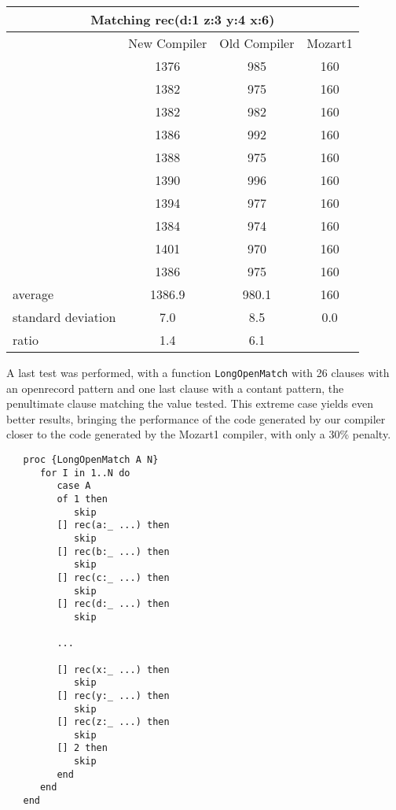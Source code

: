 \documentclass[a4paper]{memoir}
\begin{document}
\begin{appendices}
\begin{center}
\begin{tabular} {| l c c c|}
\hline
\multicolumn{4}{|c|}{\textbf{Matching rec(d:1 z:3 y:4 x:6)}} \\ \hline
  & New Compiler& Old Compiler & Mozart1 \\
  &         1376&  985& 160\\ 
  &         1382&  975& 160\\
  &         1382&  982& 160\\
  &         1386&  992& 160\\
  &         1388&  975& 160\\
  &         1390&  996& 160\\
  &         1394&  977& 160\\
  &         1384&  974& 160\\
  &         1401&  970& 160\\
  &         1386&  975& 160\\ \hline
average& 1386.9&  980.1& 160\\
standard deviation& 7.0& 8.5& 0.0\\
ratio& 1.4& 6.1 & \\
\hline
\end{tabular}
\end{center}


A last test was performed, with a function \lstinline!LongOpenMatch! with 26
clauses with an openrecord pattern and one last clause with a contant pattern, the penultimate clause matching the value tested.
This extreme case yields even better results, bringing the performance of the
code generated by our compiler closer to the code generated by the Mozart1
compiler, with only a 30\% penalty.
\begin{lstlisting}
   proc {LongOpenMatch A N}
      for I in 1..N do
         case A
         of 1 then
            skip
         [] rec(a:_ ...) then
            skip
         [] rec(b:_ ...) then
            skip
         [] rec(c:_ ...) then
            skip
         [] rec(d:_ ...) then
            skip

         ...

         [] rec(x:_ ...) then
            skip
         [] rec(y:_ ...) then
            skip
         [] rec(z:_ ...) then
            skip
         [] 2 then
            skip
         end
      end
   end
  
\end{lstlisting}



\end{appendices}
\end{document}
